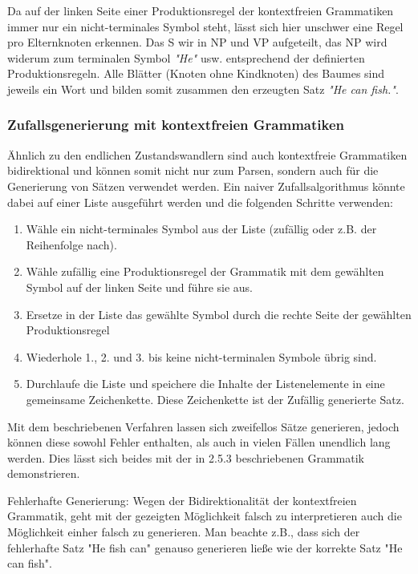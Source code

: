 \documentclass[12pt]{paper}
\begin{document}
Da auf der linken Seite einer Produktionsregel der kontextfreien Grammatiken immer nur ein nicht-terminales Symbol steht, lässt sich hier unschwer eine Regel pro Elternknoten erkennen. Das S wir in NP und VP aufgeteilt, das NP wird widerum zum terminalen Symbol \textit{"He"} usw. entsprechend der definierten Produktionsregeln. Alle Blätter (Knoten ohne Kindknoten) des Baumes sind jeweils ein Wort und bilden somit zusammen den erzeugten Satz \textit{"He can fish."}. 

\subsubsection{Zufallsgenerierung mit kontextfreien Grammatiken}

Ähnlich zu den endlichen Zustandswandlern sind auch kontextfreie Grammatiken bidirektional und können somit nicht nur zum Parsen, sondern auch für die Generierung von Sätzen verwendet werden. 
Ein naiver Zufallsalgorithmus könnte dabei auf einer Liste ausgeführt werden und die folgenden Schritte verwenden:

\begin{enumerate}
\item Wähle ein nicht-terminales Symbol aus der Liste (zufällig oder z.B. der Reihenfolge nach).
\item Wähle zufällig eine Produktionsregel der Grammatik mit dem gewählten Symbol auf der linken Seite und führe sie aus. 
\item Ersetze in der Liste das gewählte Symbol durch die rechte Seite der gewählten Produktionsregel
\item Wiederhole 1., 2. und 3. bis keine nicht-terminalen Symbole übrig sind. 
\item Durchlaufe die Liste und speichere die Inhalte der Listenelemente in eine gemeinsame Zeichenkette. Diese Zeichenkette ist der Zufällig generierte Satz. 
\end{enumerate}

Mit dem beschriebenen Verfahren lassen sich zweifellos Sätze generieren, jedoch können diese sowohl Fehler enthalten, als auch in vielen Fällen unendlich lang werden. Dies lässt sich beides mit der in 2.5.3 beschriebenen Grammatik demonstrieren. 

Fehlerhafte Generierung: Wegen der Bidirektionalität der kontextfreien Grammatik, geht mit der gezeigten Möglichkeit falsch zu interpretieren auch die Möglichkeit einher falsch zu generieren. Man beachte z.B., dass sich der fehlerhafte Satz "He fish can" genauso generieren ließe wie der korrekte Satz "He can fish".
\end{document}
